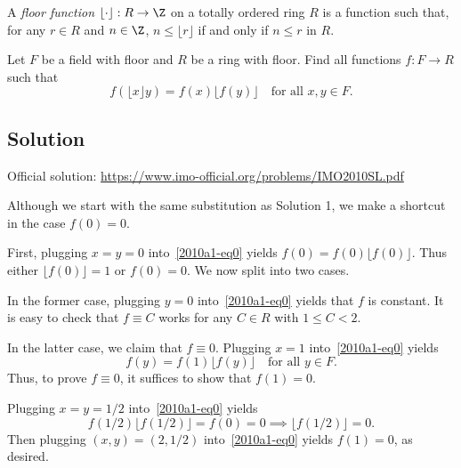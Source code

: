 A \emph{floor function} $\lfloor \cdot \rfloor : R \to \Z$ on a totally ordered ring $R$ is a function such that, for any $r \in R$ and $n \in \Z$, $n \leq \lfloor r \rfloor$ if and only if $n \leq r$ in $R$.

Let $F$ be a field with floor and $R$ be a ring with floor.
Find all functions $f : F \to R$ such that
\[ f(\lfloor x \rfloor y) = f(x) \lfloor f(y) \rfloor \quad \text{for all } x, y \in F. \tag{*}\label{2010a1-eq0} \]



\subsection*{Solution}

Official solution: \url{https://www.imo-official.org/problems/IMO2010SL.pdf}

Although we start with the same substitution as Solution 1, we make a shortcut in the case $f(0) = 0$.

First, plugging $x = y = 0$ into~\eqref{2010a1-eq0} yields $f(0) = f(0) \lfloor f(0) \rfloor$.
Thus either $\lfloor f(0) \rfloor = 1$ or $f(0) = 0$.
We now split into two cases.

In the former case, plugging $y = 0$ into~\eqref{2010a1-eq0} yields that $f$ is constant.
It is easy to check that $f \equiv C$ works for any $C \in R$ with $1 \leq C < 2$.

In the latter case, we claim that $f \equiv 0$.
Plugging $x = 1$ into~\eqref{2010a1-eq0} yields
\[ f(y) = f(1) \lfloor f(y) \rfloor \quad \text{for all } y \in F. \]
Thus, to prove $f \equiv 0$, it suffices to show that $f(1) = 0$.

Plugging $x = y = 1/2$ into~\eqref{2010a1-eq0} yields
\[ f(1/2) \lfloor f(1/2) \rfloor = f(0) = 0 \implies \lfloor f(1/2) \rfloor = 0. \]
Then plugging $(x, y) = (2, 1/2)$ into~\eqref{2010a1-eq0} yields $f(1) = 0$, as desired.
